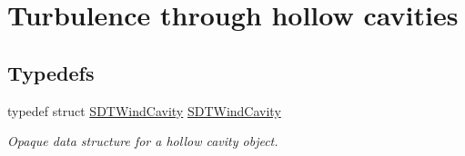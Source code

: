 \hypertarget{group__windcavity}{}\section{Turbulence through hollow cavities}
\label{group__windcavity}
\subsection*{Typedefs}
\begin{DoxyCompactItemize}
\item 
\hypertarget{group__windcavity_gab89dab8c4a56cb2ae4aa501ddfd38466}{}typedef struct \hyperlink{group__windcavity_gab89dab8c4a56cb2ae4aa501ddfd38466}{S\+D\+T\+Wind\+Cavity} \hyperlink{group__windcavity_gab89dab8c4a56cb2ae4aa501ddfd38466}{S\+D\+T\+Wind\+Cavity}\label{group__windcavity_gab89dab8c4a56cb2ae4aa501ddfd38466}

\begin{DoxyCompactList}\small\item\em Opaque data structure for a hollow cavity object. \end{DoxyCompactList}\end{DoxyCompactItemize}

